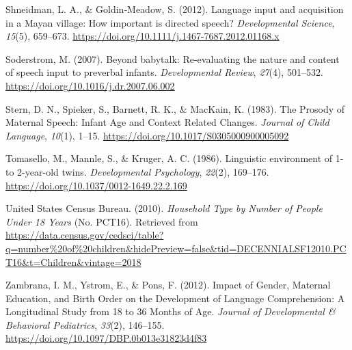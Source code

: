 \documentclass[
  man,mask,floatsintext]{apa6}
\newlength{\cslhangindent}
\newlength{\cslentryspacingunit} %
\newenvironment{CSLReferences}[2] %
 {%
  \setlength{\parindent}{0pt}
  \ifodd #1
  \let\oldpar\par
  \def\par{\hangindent=\cslhangindent\oldpar}
  \fi
  \setlength{\parskip}{#2\cslentryspacingunit}
 }%
 {}
\begin{document}
\begin{CSLReferences}{1}{0}
\leavevmode{}%
Shneidman, L. A., \& Goldin‐Meadow, S. (2012). Language input and acquisition in a {Mayan} village: How important is directed speech? \emph{Developmental Science}, \emph{15}(5), 659--673. \url{https://doi.org/10.1111/j.1467-7687.2012.01168.x}

\leavevmode{}%
Soderstrom, M. (2007). Beyond babytalk: {Re}-evaluating the nature and content of speech input to preverbal infants. \emph{Developmental Review}, \emph{27}(4), 501--532. \url{https://doi.org/10.1016/j.dr.2007.06.002}

\leavevmode{}%
Stern, D. N., Spieker, S., Barnett, R. K., \& MacKain, K. (1983). The {Prosody} of {Maternal} {Speech}: {Infant} {Age} and {Context} {Related} {Changes}. \emph{Journal of Child Language}, \emph{10}(1), 1--15. \url{https://doi.org/10.1017/S0305000900005092}

\leavevmode{}%
Tomasello, M., Mannle, S., \& Kruger, A. C. (1986). Linguistic environment of 1- to 2-year-old twins. \emph{Developmental Psychology}, \emph{22}(2), 169--176. \url{https://doi.org/10.1037/0012-1649.22.2.169}

\leavevmode{}%
United States Census Bureau. (2010). \emph{Household {Type} by {Number} of {People} {Under} 18 {Years}} (No. PCT16). Retrieved from \url{https://data.census.gov/cedsci/table?q=number\%20of\%20children\&hidePreview=false\&tid=DECENNIALSF12010.PCT16\&t=Children\&vintage=2018}

\leavevmode{}%
Zambrana, I. M., Ystrom, E., \& Pons, F. (2012). Impact of {Gender}, {Maternal} {Education}, and {Birth} {Order} on the {Development} of {Language} {Comprehension}: {A} {Longitudinal} {Study} from 18 to 36 {Months} of {Age}. \emph{Journal of Developmental \& Behavioral Pediatrics}, \emph{33}(2), 146--155. \url{https://doi.org/10.1097/DBP.0b013e31823d4f83}

\end{CSLReferences}

\endgroup
\end{document}
